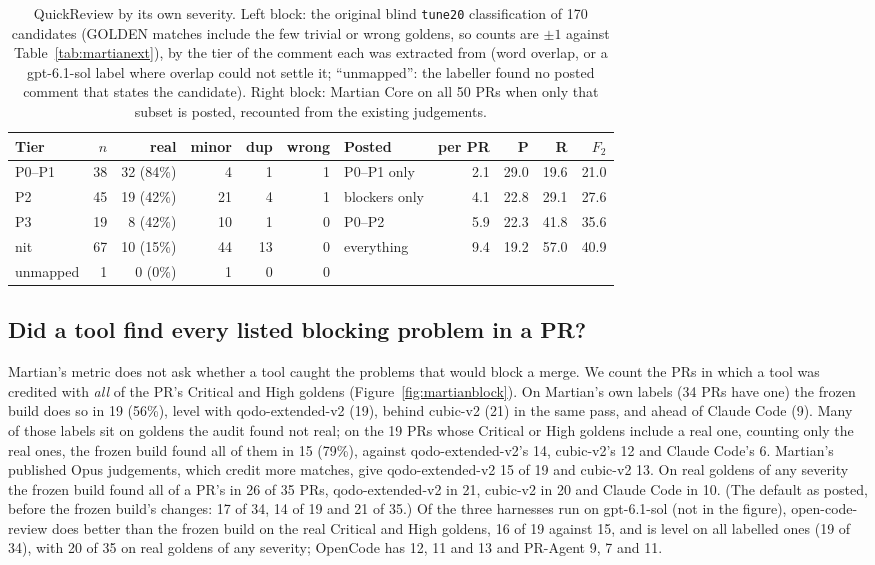 \documentclass[11pt,a4paper]{article}
\newcommand{\qcr}{QuickReview}
\newcommand{\code}[1]{\texttt{#1}}
\begin{document}
\begin{table}[tbp]
  \centering
  \caption{\qcr{} by its own severity. Left block: the original blind
  \code{tune20} classification of 170 candidates (GOLDEN matches include the
  few trivial or wrong goldens, so counts are $\pm 1$ against
  Table~\ref{tab:martianext}), by the tier of the comment each was extracted
  from (word overlap, or a gpt-6.1-sol label where overlap could not settle
  it; ``unmapped'': the labeller found no posted comment that states the candidate).
  Right block: Martian Core on all 50 PRs when only that subset is posted,
  recounted from the existing judgements.}
  \label{tab:martiantiers}
  \small
  \begin{tabular}{lrrrrr@{\quad}lrrrr}
    \toprule
    Tier & $n$ & real & minor & dup & wrong & Posted & per PR & P & R & $F_2$ \\
    \midrule
    P0--P1 & 38 & 32 (84\%) & 4 & 1 & 1 & P0--P1 only & 2.1 & 29.0 & 19.6 & 21.0 \\
    P2 & 45 & 19 (42\%) & 21 & 4 & 1 & blockers only & 4.1 & 22.8 & 29.1 & 27.6 \\
    P3 & 19 & 8 (42\%) & 10 & 1 & 0 & P0--P2 & 5.9 & 22.3 & 41.8 & 35.6 \\
    nit & 67 & 10 (15\%) & 44 & 13 & 0 & everything & 9.4 & 19.2 & 57.0 & 40.9 \\
    unmapped & 1 & 0 (0\%) & 1 & 0 & 0 & & & & & \\
    \bottomrule
  \end{tabular}
\end{table}

\subsection{Did a tool find every listed blocking problem in a PR?}
\label{sec:martianblocking}

Martian's metric does not ask whether a tool caught the problems that would
block a merge. We count the PRs in which a tool was credited with \emph{all}
of the PR's Critical and High goldens (Figure~\ref{fig:martianblock}). On
Martian's own labels (34 PRs have one) the frozen build does so in 19
(56\%), level with qodo-extended-v2 (19), behind cubic-v2 (21) in the same
pass, and ahead of Claude Code (9). Many of those labels sit on goldens the
audit found not real; on the 19 PRs whose Critical or High goldens include a
real one, counting only the real ones, the frozen build found all of them in
15 (79\%), against qodo-extended-v2's 14, cubic-v2's 12 and Claude Code's 6.
Martian's published Opus judgements, which credit more matches, give
qodo-extended-v2 15 of 19 and cubic-v2 13. On real goldens of any severity the
frozen build found all of a PR's in 26 of 35 PRs, qodo-extended-v2 in 21,
cubic-v2 in 20 and Claude Code in 10. (The default as posted, before the
frozen build's changes: 17 of 34, 14 of 19 and 21 of 35.) Of the three
harnesses run on gpt-6.1-sol (not in the figure), open-code-review does
better than the frozen build on the real Critical and High goldens, 16 of
19 against 15, and is level on all labelled ones (19 of 34), with 20 of 35
on real goldens of any severity; OpenCode has 12, 11 and 13 and PR-Agent 9,
7 and 11.
\end{document}

